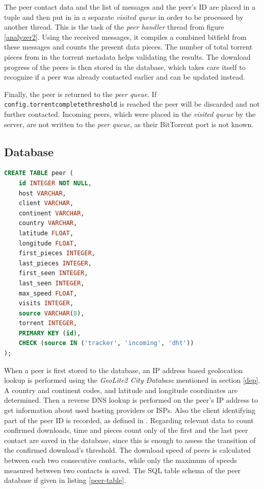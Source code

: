 \documentclass[10pt, a4paper, twoside, headsepline]{scrbook}
\renewcommand{\_}{\origunderscore\allowbreak}
\newcommand{\config}[1]{\texttt{config.\allowbreak #1}}
\begin{document}
The peer contact data and the list of messages and the peer's ID are placed in a tuple and then put in in a separate \emph{visited queue} in order to be processed by another thread. This is the task of the \emph{peer handler} thread from figure \ref{analyzer2}. Using the received messages, it compiles a combined bitfield from these messages and counts the present data pieces. The number of total torrent pieces from in the torrent metadata helps validating the results. The download progress of the peers is then stored in the database, which takes care itself to recognize if a peer was already contacted earlier and can be updated instead.

Finally, the peer is returned to the \emph{peer queue}. If \config{torrent\_complete\_threshold} is reached the peer will be discarded and not further contacted. Incoming peers, which were placed in the \emph{visited queue} by the server, are not written to the \emph{peer queue}, as their BitTorrent port is not known.

\subsection{Database}
\begin{lstlisting}[float, language=SQL, caption={[Schema of the peer table]Schema of the peer table in SQL.}, captionpos=b, label=peer-table]
CREATE TABLE peer (
	id INTEGER NOT NULL,
	host VARCHAR,
	client VARCHAR,
	continent VARCHAR,
	country VARCHAR,
	latitude FLOAT,
	longitude FLOAT,
	first_pieces INTEGER,
	last_pieces INTEGER,
	first_seen INTEGER,
	last_seen INTEGER,
	max_speed FLOAT,
	visits INTEGER,
	source VARCHAR(8),
	torrent INTEGER,
	PRIMARY KEY (id),
	CHECK (source IN ('tracker', 'incoming', 'dht'))
);
\end{lstlisting}

When a peer is first stored to the database, an IP address based geolocation lookup is performed using the \emph{GeoLite2 City Database} mentioned in section \ref{dep}. A country and continent codes, and latitude and longitude coordinates are determined. Then a reverse DNS lookup is performed on the peer's IP address to get information about used hosting providers or ISPs. Also the client identifying part of the peer ID is recorded, as defined in \cite{bep20}. Regarding relevant data to count confirmed downloads, time and pieces count only of the first and the last peer contact are saved in the database, since this is enough to assess the transition of the confirmed download's threshold. The download speed of peers is calculated between each two consecutive contacts, while only the maximum of speeds measured between two contacts is saved. The SQL table schema of the peer database if given in listing \ref{peer-table}.
\end{document}
